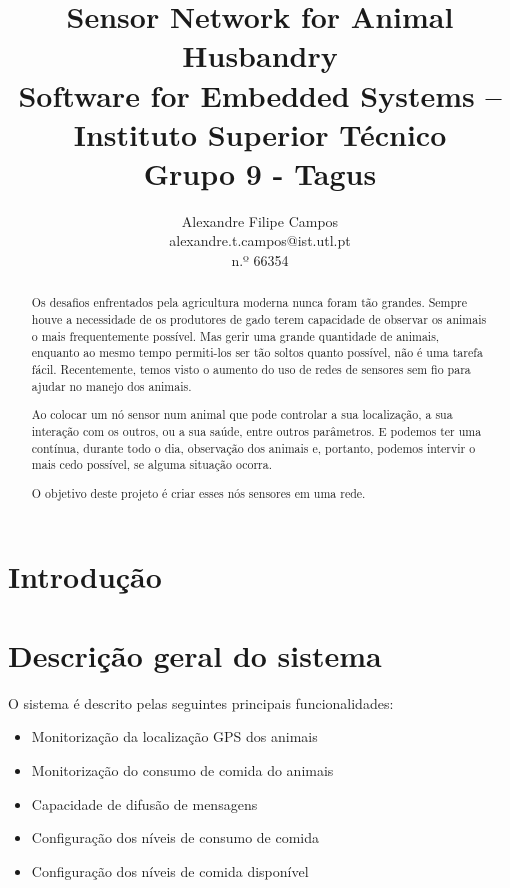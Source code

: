 \documentclass[times,10pt,twocolumn]{article}
\begin{document}
\title{
	Sensor Network for Animal Husbandry
	\\
	\large Software for Embedded Systems -- Instituto Superior Técnico
	\\
	\normalsize{Grupo 9 - Tagus}
}

\author{
	Alexandre Filipe Campos\\ alexandre.t.campos@ist.utl.pt\\n.º 66354	}

\maketitle
\thispagestyle{empty}


\begin{abstract}
Os desafios enfrentados pela agricultura moderna nunca foram tão grandes. Sempre houve a necessidade de os produtores de gado terem capacidade de observar os animais o mais frequentemente possível. Mas gerir uma grande quantidade de animais, enquanto ao mesmo tempo permiti-los ser tão soltos quanto possível, não é uma tarefa fácil. Recentemente, temos visto o aumento do uso de redes de sensores sem fio para ajudar no manejo dos animais. 

Ao colocar um nó sensor num animal que pode controlar a sua localização, a sua interação com os outros, ou a sua saúde, entre outros parâmetros. E podemos ter uma contínua, durante todo o dia, observação dos animais e, portanto, podemos intervir o mais cedo possível, se alguma situação ocorra. 

O objetivo deste projeto é criar esses nós sensores em uma rede.
 
\end{abstract}


\section*{Introdução}
\section{Descrição geral do sistema}

O sistema é descrito pelas seguintes principais funcionalidades:

\begin{itemize}
	\item Monitorização da localização GPS dos animais
	\item Monitorização do consumo de comida do animais
	\item Capacidade de difusão de mensagens
	\item Configuração dos níveis de consumo de comida
	\item Configuração dos níveis de comida disponível 
\end{itemize}
\end{document}
